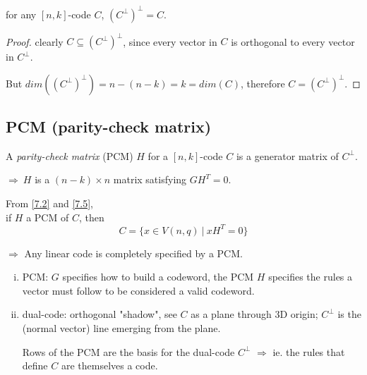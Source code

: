\documentclass{article}
\theoremstyle{definition}
\newenvironment{defn}[1]
{\renewcommand\theinnerdefn{#1}\innerdefn}
{\endinnerdefn}
\newenvironment{thm}[1]
{\renewcommand\theinnerthm{#1}\innerthm}
{\endinnerthm}
\newenvironment{intuition}[1]
{\renewcommand\theinnerintu{#1}\innerintu}
{\endinnerintu}
\newcommand{\Vnq}{V(n, q)}
\begin{document}
\begin{thm}{7.5} \label{7.5}
  for any $[n,k]$-code $C$, $(C^\perp)^\perp = C$.
\end{thm}
\begin{proof}
  clearly $C \subseteq (C^\perp)^\perp$, since every vector in $C$ is orthogonal to every vector in $C^\perp$.

  But $dim((C^\perp)^\perp) = n - (n - k ) = k = dim(C)$, therefore $C=(C^\perp)^\perp$.
\end{proof}


\subsection{PCM (parity-check matrix)}

\begin{defn}{}[PCM]
  A \emph{parity-check matrix} (PCM) $H$ for a $[n,k]$-code $C$ is a generator matrix of $C^\perp$.

  $\Longrightarrow~H$ is a $(n-k) \times n$ matrix satisfying $GH^T=0$.
\end{defn}

From \ref{7.2} and \ref{7.5},\\
if $H$ a PCM of $C$, then
$$C = \{ x \in \Vnq ~|~ xH^T=0 \}$$

$\Longrightarrow$ Any linear code is completely specified by a PCM.

\vspace{0.5cm}

\begin{intuition}{}
  \begin{enumerate}[i.]
    \item{PCM:} $G$ specifies how to build a codeword, the PCM $H$ specifies the rules a vector must follow to be considered a valid codeword.
    \item{dual-code:} orthogonal "shadow", see $C$ as a plane through 3D origin; $C^\perp$ is the (normal vector) line emerging from the plane.

    Rows of the PCM are the basis for the dual-code $C^\perp$ $\Longrightarrow$ ie. the rules that define $C$ are themselves a code.
  \end{enumerate}
\end{intuition}
\end{document}

